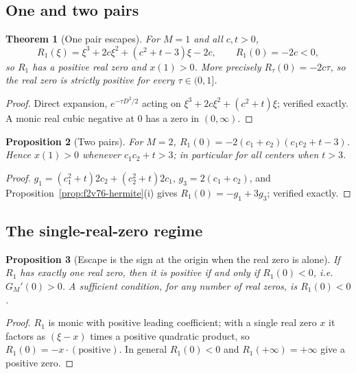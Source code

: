 \documentclass[11pt]{article}
\newtheorem{theorem}{Theorem}[section]
\newtheorem{proposition}[theorem]{Proposition}
\theoremstyle{definition}
\theoremstyle{remark}
\begin{document}
\subsection{One and two pairs}

\begin{theorem}[One pair escapes]
\label{thm:f2v76-onepair}
For \(M=1\) and all \(c,t>0\),
\begin{equation}
 R_1(\xi)=\xi^3+2c\xi^2+(c^2+t-3)\xi-2c,\qquad R_1(0)=-2c<0,
 \label{eq:f2v76-onepair}
\end{equation}
so \(R_1\) has a positive real zero and \(x(1)>0\).  More precisely
\(R_\tau(0)=-2c\tau\), so the real zero is strictly positive for every
\(\tau\in(0,1]\).
\end{theorem}

\begin{proof}
Direct expansion, \(e^{-\tau D^2/2}\) acting on \(\xi^3+2c\xi^2+(c^2+t)\xi\);
verified exactly.  A monic real cubic negative at \(0\) has a zero in
\((0,\infty)\).
\end{proof}

\begin{proposition}[Two pairs]
\label{prop:f2v76-twopairs}
For \(M=2\), \(R_1(0)=-2(c_1+c_2)(c_1c_2+t-3)\).  Hence \(x(1)>0\)
whenever \(c_1c_2+t>3\); in particular for all centers when \(t>3\).
\end{proposition}

\begin{proof}
\(g_1=(c_1^2+t)2c_2+(c_2^2+t)2c_1\), \(g_3=2(c_1+c_2)\), and
Proposition~\ref{prop:f2v76-hermite}(i) gives \(R_1(0)=-g_1+3g_3\);
verified exactly.
\end{proof}

\subsection{The single-real-zero regime}

\begin{proposition}[Escape is the sign at the origin when the real zero is alone]
\label{prop:f2v76-alone}
If \(R_1\) has exactly one real zero, then it is positive if and only if
\(R_1(0)<0\), i.e.\ \(G_M'(0)>0\).  A sufficient condition, for any
number of real zeros, is \(R_1(0)<0\).
\end{proposition}

\begin{proof}
\(R_1\) is monic with positive leading coefficient; with a single real
zero \(x\) it factors as \((\xi-x)\) times a positive quadratic product,
so \(R_1(0)=-x\cdot(\text{positive})\).  In general \(R_1(0)<0\) and
\(R_1(+\infty)=+\infty\) give a positive zero.
\end{proof}
\end{document}
